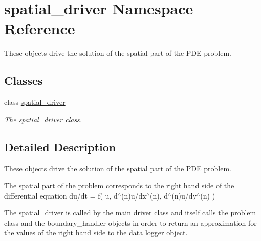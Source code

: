 \hypertarget{namespacespatial__driver}{}\section{spatial\+\_\+driver Namespace Reference}
\label{namespacespatial__driver}


These objects drive the solution of the spatial part of the P\+DE problem.  


\subsection*{Classes}
\begin{DoxyCompactItemize}
\item 
class \hyperlink{classspatial__driver_1_1spatial__driver}{spatial\+\_\+driver}
\begin{DoxyCompactList}\small\item\em The \hyperlink{classspatial__driver_1_1spatial__driver}{spatial\+\_\+driver} class. \end{DoxyCompactList}\end{DoxyCompactItemize}


\subsection{Detailed Description}
These objects drive the solution of the spatial part of the P\+DE problem. 

The spatial part of the problem corresponds to the right hand side of the differential equation du/dt = f( u, d$^\wedge$(n)u/dx$^\wedge$(n), d$^\wedge$(n)u/dy$^\wedge$(n) )

The \hyperlink{namespacespatial__driver}{spatial\+\_\+driver} is called by the main driver class and itself calls the problem class and the boundary\+\_\+handler objects in order to return an approximation for the values of the right hand side to the data logger object. 